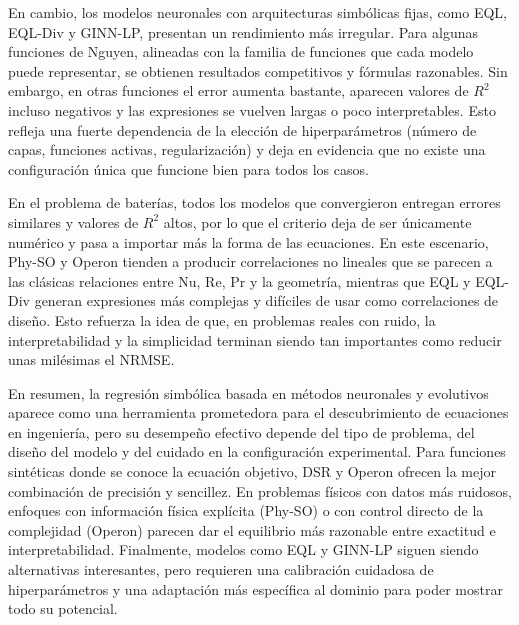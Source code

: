 En cambio, los modelos neuronales con arquitecturas simbólicas fijas, como EQL,
EQL-Div y GINN-LP, presentan un rendimiento más irregular. Para algunas funciones de
Nguyen, alineadas con la familia de funciones que cada modelo puede representar, se
obtienen resultados competitivos y fórmulas razonables. Sin embargo, en otras funciones el
error aumenta bastante, aparecen valores de $R^{2}$ incluso negativos y las expresiones se
vuelven largas o poco interpretables. Esto refleja una fuerte dependencia de la elección de
hiperparámetros (número de capas, funciones activas, regularización) y deja en evidencia
que no existe una configuración única que funcione bien para todos los casos.

En el problema de baterías, todos los modelos que convergieron entregan errores
similares y valores de $R^{2}$ altos, por lo que el criterio deja de ser únicamente numérico
y pasa a importar más la forma de las ecuaciones. En este escenario, Phy-SO y Operon
tienden a producir correlaciones no lineales que se parecen a las clásicas relaciones entre
Nu, Re, Pr y la geometría, mientras que EQL y EQL-Div generan expresiones más complejas
y difíciles de usar como correlaciones de diseño. Esto refuerza la idea de que, en problemas
reales con ruido, la interpretabilidad y la simplicidad terminan siendo tan importantes
como reducir unas milésimas el NRMSE.

En resumen, la regresión simbólica basada en métodos neuronales y evolutivos aparece
como una herramienta prometedora para el descubrimiento de ecuaciones en ingeniería,
pero su desempeño efectivo depende del tipo de problema, del diseño del modelo y del
cuidado en la configuración experimental. Para funciones sintéticas donde se conoce la
ecuación objetivo, DSR y Operon ofrecen la mejor combinación de precisión y sencillez. En
problemas físicos con datos más ruidosos, enfoques con información física explícita
(Phy-SO) o con control directo de la complejidad (Operon) parecen dar el equilibrio más
razonable entre exactitud e interpretabilidad. Finalmente, modelos como EQL y GINN-LP
siguen siendo alternativas interesantes, pero requieren una calibración cuidadosa de
hiperparámetros y una adaptación más específica al dominio para poder mostrar todo su
potencial.